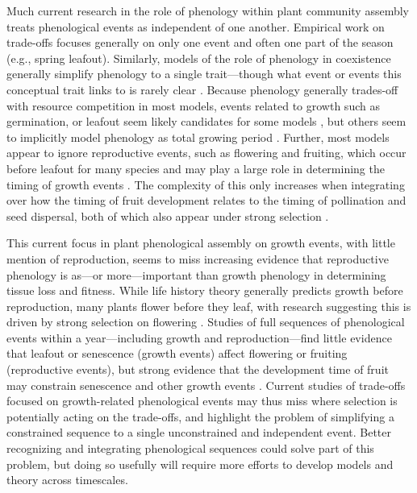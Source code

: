 \documentclass[11pt]{article}
\begin{document}
Much current research in the role of phenology within plant community assembly treats phenological events as independent of one another. Empirical work on trade-offs focuses generally on only one event and often one part of the season (e.g., spring leafout). Similarly, models of the role of phenology in coexistence generally simplify phenology to a single trait---though what event or events this conceptual trait links to is rarely clear \citep[even when studied with empirical data,][]{godoy2014}. Because phenology generally trades-off with resource competition in most models, events related to growth such as germination, or leafout seem likely candidates for some models \citep[e.g.,][]{godoy2014,wolkovich2021phenological}, but others seem to implicitly model phenology as total growing period \citep{levine2022competition}. Further, most models appear to ignore reproductive events, such as flowering and fruiting, which occur before leafout for many species \citep{Primack:1987jz,dan2021nph} and may play a large role in determining the timing of growth events \citep{ettinger2018phenological}. The complexity of this only increases when integrating over how the timing of fruit development relates to the timing of pollination and seed dispersal, both of which also appear under strong selection \citep{whitehead1969wind}.

This current focus in plant phenological assembly on growth events, with little mention of reproduction, seems to miss increasing evidence that reproductive phenology is as---or more---important than growth phenology in determining tissue loss and fitness. While life history theory generally predicts growth before reproduction, many plants flower before they leaf, with research suggesting this is driven by strong selection on flowering \citep{dan2021nph}. Studies of full sequences of phenological events within a year---including growth and reproduction---find little evidence that leafout or senescence (growth events) affect flowering or fruiting (reproductive events), but strong evidence that the development time of fruit may constrain senescence and other growth events \citep{ettinger2018phenological}. Current studies of trade-offs focused on growth-related phenological events may thus miss where selection is potentially acting on the trade-offs, and highlight the problem of simplifying a constrained sequence to a single unconstrained and independent event. Better recognizing and integrating phenological sequences could solve part of this problem, but doing so usefully will require more efforts to develop models and theory across timescales. 
\end{document}
